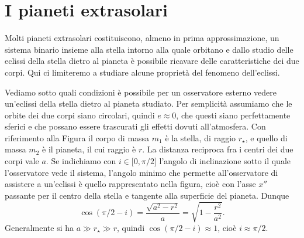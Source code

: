 \section{I pianeti extrasolari}
\label{sec:extrasolari}

Molti pianeti extrasolari costituiscono, almeno in prima approssimazione, un
sistema binario insieme alla stella intorno alla quale orbitano e dallo studio
delle eclissi della stella dietro al pianeta è possibile ricavare delle
caratteristiche dei due corpi. Qui ci limiteremo a studiare alcune proprietà del
fenomeno dell'eclissi.

Vediamo sotto quali condizioni è possibile per un osservatore esterno vedere
un'eclissi della stella dietro al pianeta studiato. Per semplicità assumiamo che
le orbite dei due corpi siano circolari, quindi $e \approx 0$, che questi siano
perfettamente sferici e che possano essere trascurati gli effetti dovuti
all'atmosfera. Con riferimento alla Figura %
il corpo di massa $m_1$ è la stella, di raggio $r_\star$, e quello di massa
$m_2$ è il pianeta, il cui raggio è $r$. La distanza reciproca fra i centri dei
due corpi vale $a$. Se indichiamo con $i \in \mathopen{[}0, \pi/2\mathclose{]}$
l'angolo di inclinazione sotto il quale l'osservatore vede il sistema, l'angolo
minimo che permette all'osservatore di assistere a un'eclissi è quello
rappresentato nella figura, cioè con l'asse $x''$ passante per il centro della
stella e tangente alla superficie del pianeta. Dunque
\begin{equation}
  \cos(\pi/2 - i) = \frac{\sqrt{a^2 - r^2}}{a} = \sqrt{1 - \frac{r^2}{a^2}}.
\end{equation}
Generalmente si ha $a \gg r_\star \gg r$, quindi $\cos(\pi/2 - i) \approx 1$,
cioè $i \approx \pi/2$.

